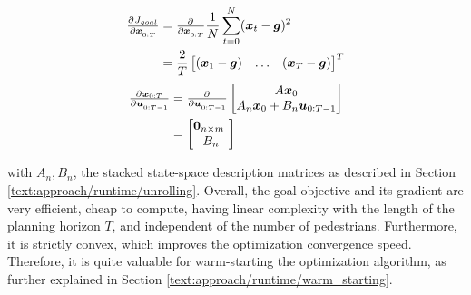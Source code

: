 \begin{align}
\pd{J_{goal}}{\x_{0:T}} &= \pd{}{\x_{0:T}} \frac{1}{N} \sum_{t = 0}^N (\x_t - \goal)^2 \\
&= \frac{2}{T} \begin{bmatrix} (\x_1 - \goal) & \hdots & (\x_T - \goal) \end{bmatrix}^T
\end{align}
\begin{align}
\pd{\x_{0:T}}{\u_{0:T-1}} &= \pd{}{\u_{0:T-1}} \begin{bmatrix} A \x_0 \\ A_n \x_0 + B_n \u_{0:T-1} \end{bmatrix} \\
&= \begin{bmatrix} \boldsymbol{0}_{n \times m} \\ B_n \end{bmatrix}
\label{eq:goal_gradient_dynamics}
\end{align}

with $A_n, B_n$, the stacked state-space description matrices as described in Section \ref{text:approach/runtime/unrolling}.
\newline
Overall, the goal objective and its gradient are very efficient, cheap to compute, having linear complexity with the length of the planning horizon $T$, and independent of the number of pedestrians. Furthermore, it is strictly convex, which improves the optimization convergence speed. Therefore, it is quite valuable for warm-starting the optimization algorithm, as further explained in Section \ref{text:approach/runtime/warm_starting}.
